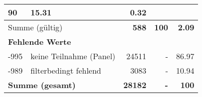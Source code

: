 \begin{longtable}{lXrrr}
       \num{90} &
       \num[round-mode=places,round-precision=2]{15,31} &
         \num[round-mode=places,round-precision=2]{0,32} \\
     \midrule
     \multicolumn{2}{l}{Summe (gültig)} &
       \textbf{\num{588}} &
     \textbf{100} &
       \textbf{\num[round-mode=places,round-precision=2]{2,09}} \\
     \multicolumn{5}{l}{\textbf{Fehlende Werte}}\\
       -995 &
       keine Teilnahme (Panel) &
         \num{24511} &
        - &
         \num[round-mode=places,round-precision=2]{86,97} \\
       -989 &
       filterbedingt fehlend &
         \num{3083} &
        - &
         \num[round-mode=places,round-precision=2]{10,94} \\
     \midrule
     \multicolumn{2}{l}{\textbf{Summe (gesamt)}} &
          \textbf{\num{28182}} &
        \textbf{-} &
        \textbf{100} \\
     \bottomrule
     \end{longtable}
     

